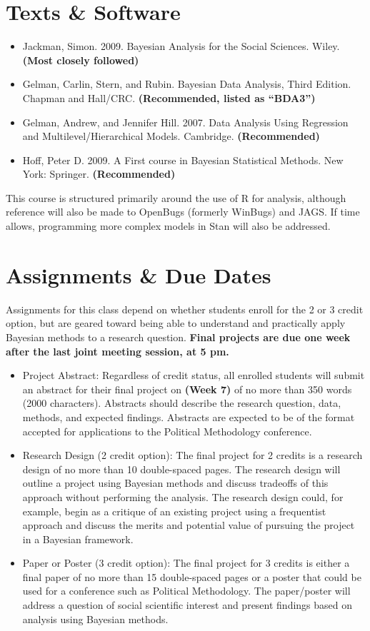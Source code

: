 \documentclass[11pt, leqno, fleqn]{article}
\begin{document}
\section*{Texts \& Software}
\begin{itemize}
\item[] Jackman, Simon. 2009. Bayesian Analysis for the Social Sciences. Wiley. {\bf(Most closely followed)}
\item[] Gelman, Carlin, Stern, and Rubin. Bayesian Data Analysis, Third Edition. Chapman and Hall/CRC. {\bf(Recommended, listed as ``BDA3'')}
\item[] Gelman, Andrew, and Jennifer Hill. 2007. Data Analysis Using Regression and Multilevel/Hierarchical Models. Cambridge. {\bf(Recommended)}
\item[] Hoff, Peter D. 2009. A First course in Bayesian Statistical Methods. New York: Springer. {\bf (Recommended)}
\end{itemize}
This course is structured primarily around the use of \textsf{R} for analysis, although reference will also be made to OpenBugs (formerly WinBugs) and JAGS. If time allows, programming more complex models in Stan will also be addressed.\\

\section*{Assignments \& Due Dates}
\noindent Assignments for this class depend on whether students enroll for the 2 or 3 credit option, but are geared toward being able to understand and practically apply Bayesian methods to a research question. {\bf Final projects are due one week after the last joint meeting session, at 5 pm.}
\begin{itemize}
\item Project Abstract: Regardless of credit status, all enrolled students will submit an abstract for their final project on {\bf (Week 7)} of no more than 350 words (2000 characters). Abstracts should describe the research question, data, methods, and expected findings. Abstracts are expected to be of the format accepted for applications to the Political Methodology conference.
\item Research Design (2 credit option): The final project for 2 credits is a research design of no more than 10 double-spaced pages. The research design will outline a project using Bayesian methods and discuss tradeoffs of this approach without performing the analysis. The research design could, for example, begin as a critique of an existing project using a frequentist approach and discuss the merits and potential value of pursuing the project in a Bayesian framework.
\item Paper or Poster (3 credit option): The final project for 3 credits is either a final paper of no more than 15 double-spaced pages or a poster that could be used for a conference such as Political Methodology. The paper/poster will address a question of social scientific interest and present findings based on analysis using Bayesian methods.
\end{itemize}
\end{document}
